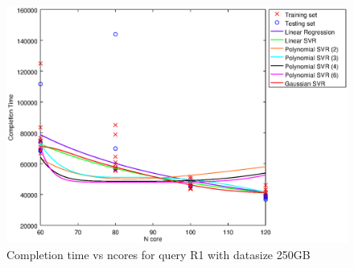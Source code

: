 
\begin {figure}[hbtp]
\centering
\includegraphics[width=\textwidth]{output/R1_250_ONLY_1_OVER_NCORES/plot_R1_250.eps}
\caption{Completion time vs ncores for query R1 with datasize 250GB}
\label{fig:all_nonlinear_R1_250}
\end {figure}
